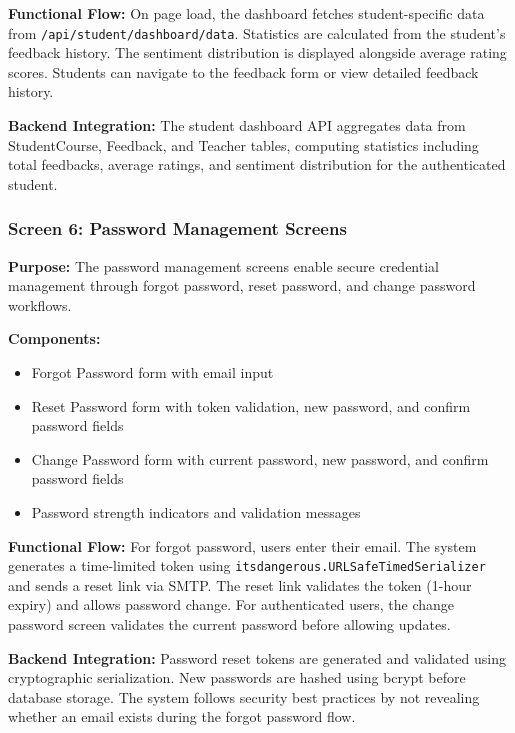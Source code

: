 \textbf{Functional Flow:}
On page load, the dashboard fetches student-specific data from \texttt{/api/student/dashboard/data}. Statistics are calculated from the student's feedback history. The sentiment distribution is displayed alongside average rating scores. Students can navigate to the feedback form or view detailed feedback history.

\textbf{Backend Integration:}
The student dashboard API aggregates data from StudentCourse, Feedback, and Teacher tables, computing statistics including total feedbacks, average ratings, and sentiment distribution for the authenticated student.



\subsubsection{Screen 6: Password Management Screens}

\textbf{Purpose:}
The password management screens enable secure credential management through forgot password, reset password, and change password workflows.

\textbf{Components:}
\begin{itemize}
    \item Forgot Password form with email input
    \item Reset Password form with token validation, new password, and confirm password fields
    \item Change Password form with current password, new password, and confirm password fields
    \item Password strength indicators and validation messages
\end{itemize}

\textbf{Functional Flow:}
For forgot password, users enter their email. The system generates a time-limited token using \texttt{itsdangerous.URLSafeTimedSerializer} and sends a reset link via SMTP. The reset link validates the token (1-hour expiry) and allows password change. For authenticated users, the change password screen validates the current password before allowing updates.

\textbf{Backend Integration:}
Password reset tokens are generated and validated using cryptographic serialization. New passwords are hashed using bcrypt before database storage. The system follows security best practices by not revealing whether an email exists during the forgot password flow.


